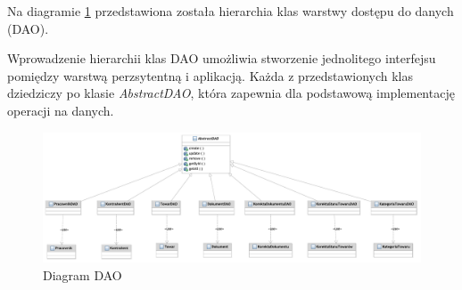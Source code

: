 Na diagramie \ref{fig:DiagramDAO} przedstawiona została hierarchia klas warstwy dostępu do danych (DAO).

Wprowadzenie hierarchii klas DAO umożliwia stworzenie jednolitego interfejsu pomiędzy warstwą perzsytentną i aplikacją. Każda z przedstawionych klas dziedziczy po klasie \textit{AbstractDAO}, która zapewnia dla podstawową implementację operacji na danych.

\begin{figure}[!htb]
  \begin{center}
    \includegraphics[scale=0.4]{../img/model/diagram_dao.pdf}
  \end{center}
  \caption{Diagram DAO}
  \label{fig:DiagramDAO}
\end{figure}
\FloatBarrier